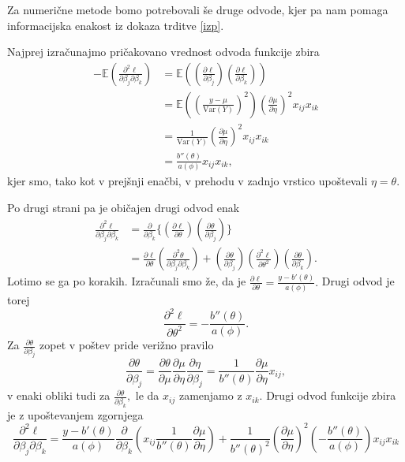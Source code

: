 \documentclass[12pt,a4paper]{amsart}
\theoremstyle{definition} %
\theoremstyle{plain} %
\begin{document}
Za numerične metode bomo potrebovali še druge odvode, kjer pa nam pomaga informacijska enakost iz dokaza trditve \ref{izp}.

Najprej izračunajmo pričakovano vrednost odvoda funkcije zbira
\begin{align*}
    -\mathbb{E}\left(\frac{\partial^2 \ell}{\partial\beta_{j}\partial\beta_{k}}\right) &= \mathbb{E}\left((\frac{\partial \ell}{\partial \beta_{j}})(\frac{\partial \ell}{\partial \beta_{k}})\right) \\
    &= \mathbb{E}\left(\left(\frac{y-\mu}{\mathrm{Var}(Y)}\right)^{2}\right)(\frac{\partial\mu}{\partial\eta})^{2}x_{ij}x_{ik} \\
    &= \frac{1}{\mathrm{Var}(Y)}(\frac{\partial\mu}{\partial\eta})^{2}x_{ij}x_{ik} \\
    &= \frac{b''(\theta)}{a(\phi)}x_{ij}x_{ik},
\end{align*}
kjer smo, tako kot v prejšnji enačbi, v prehodu v zadnjo vrstico upoštevali $\eta = \theta.$ 

Po drugi strani pa je običajen drugi odvod enak
\begin{align}\label{drugiOdvodZbira}
    \frac{\partial^2\ell}{\partial\beta_{j}\partial\beta_{k}} &= \frac{\partial}{\partial\beta_{k}}\{\left(\frac{\partial \ell}{\partial\theta}\right)\left(\frac{\partial \theta}{\partial\beta_{j}}\right)\} \nonumber \\
    &= \frac{\partial \ell}{\partial\theta}\left(\frac{\partial^2\theta}{\partial\beta_{j}\partial\beta_{k}}\right) + \left(\frac{\partial\theta}{\partial\beta_{j}}\right)\left(\frac{\partial^2\ell}{\partial\theta^2}\right)\left(\frac{\partial\theta}{\partial\beta_{k}}\right).
\end{align}
Lotimo se ga po korakih. Izračunali smo že, da je $\frac{\partial \ell}{\partial\theta} = \frac{y-b'(\theta)}{a(\phi)}.$ Drugi odvod je torej
\[
    \frac{\partial^2 \ell}{\partial\theta^2} = -\frac{b''(\theta)}{a(\phi)}.
\]
Za $\frac{\partial\theta}{\partial\beta_{j}}$ zopet v poštev pride verižno pravilo
\[
    \frac{\partial\theta}{\partial\beta_{j}} = \frac{\partial\theta}{\partial\mu}\frac{\partial\mu}{\partial\eta}\frac{\partial\eta}{\partial\beta_{j}} = \frac{1}{b''(\theta)}\frac{\partial\mu}{\partial\eta}x_{ij},
\]
v enaki obliki tudi za $\frac{\partial\theta}{\partial\beta_{k}},$ le da $x_{ij}$ zamenjamo z $x_{ik}.$
Drugi odvod funkcije zbira je z upoštevanjem zgornjega
\[
    \frac{\partial^2\ell}{\partial\beta_{j}\partial\beta_{k}} = \frac{y-b'(\theta)}{a(\phi)}\frac{\partial}{\partial\beta_{k}}\left(x_{ij}\frac{1}{b''(\theta)}\frac{\partial\mu}{\partial\eta}\right) + 
    \frac{1}{b''(\theta)^2}\left(\frac{\partial\mu}{\partial\eta}\right)^2\left(-\frac{b''(\theta)}{a(\phi)}\right)x_{ij}x_{ik}
\]
\end{document}
